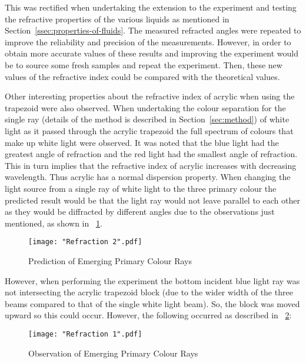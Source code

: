 \documentclass{article}
\newcommand{\figref}[2][\figurename~]{#1\ref{#2}}
\newcommand{\secref}[2][Section~]{#1\ref{#2}}
\begin{document}
\vspace{2mm}
\noindent
This was rectified when undertaking the extension to the experiment and testing the refractive properties of the various liquids as mentioned in \secref{ssec:properties-of-fluids}. The measured refracted angles were repeated to improve the reliability and precision of the measurements. However, in order to obtain more accurate values of these results and improving the experiment would be to source some fresh samples and repeat the experiment. Then, these new values of the refractive index could be compared with the theoretical values. 

\vspace{2mm}
\noindent
Other interesting properties about the refractive index of acrylic when using the trapezoid were also observed. When undertaking the colour separation for the single ray (details of the method is described in \secref{sec:method}) of white light as it passed through the acrylic trapezoid the full spectrum of colours that make up white light were observed. It was noted that the blue light had the greatest angle of refraction and the red light had the smallest angle of refraction. This in turn implies that the refractive index of acrylic increases with decreasing wavelength. Thus acrylic has a normal dispersion property. When changing the light source from a single ray of white light to the three primary colour the predicted result would be that the light ray would not leave parallel to each other as they would be diffracted by different angles due to the observations just mentioned, as shown in \figref{fig:refraction-2}. 

\begin{figure}[h]
\centering
\texttt{[image: "Refraction 2".pdf]}
\caption{Prediction of Emerging Primary Colour Rays}
\label{fig:refraction-2}
\end{figure}

\noindent
However, when performing the experiment the bottom incident blue light ray was not intersecting the acrylic trapezoid block (due to the wider width of the three beams compared to that of the single white light beam). So, the block was moved upward so this could occur. However, the following occurred as described in \figref{fig:refraction-1}:

\begin{figure}[h]
\centering
\texttt{[image: "Refraction 1".pdf]}
\caption{Observation of Emerging Primary Colour Rays}
\label{fig:refraction-1}
\end{figure}
\end{document}
